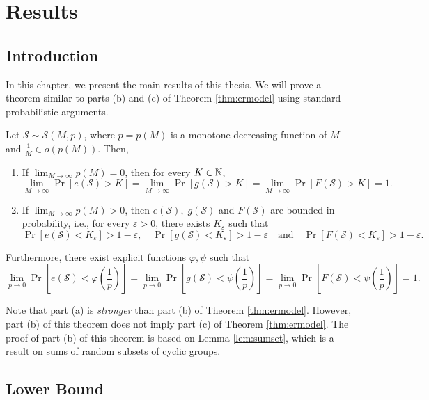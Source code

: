 \chapter{Results}\label{chap:results}


\section{Introduction}  

In this chapter, we present the main results of this thesis. We will prove a theorem similar to parts (b) and (c) of Theorem \ref{thm:ermodel} using standard probabilistic arguments. 

\begin{theorem}\label{thm:main}
    Let $\mathcal{S} \sim \mathcal{S}(M, p)$, where $p = p(M)$ is a monotone decreasing function of $M$ and $\frac{1}{M} \in o(p(M))$. Then, 
\begin{enumerate}[label=(\alph*)]
    \item If $\lim_{M \to \infty} p(M) = 0$, then for every $K \in \mathbb{N}$,   
    \[\lim_{M \to \infty} \Pr[e(\mathcal{S}) > K] = \lim_{M \to \infty} \Pr[g(\mathcal{S}) > K] = \lim_{M \to \infty} \Pr[F(\mathcal{S}) > K] = 1.\]
    \item If $\lim_{M \to \infty} p(M) > 0$, then $e(\mathcal{S}), \; g(\mathcal{S})$ and $F(\mathcal{S})$ are bounded in probability, i.e., for every $\varepsilon > 0$, there exists $K_\varepsilon$ such that 
    \[ \Pr[e(\mathcal{S}) < K_\varepsilon] > 1 - \varepsilon, \quad  \Pr[g(\mathcal{S}) < K_\varepsilon] > 1- \varepsilon \quad \text{and} \quad \Pr[F(\mathcal{S}) < K_\varepsilon] > 1 - \varepsilon.\]
\end{enumerate}
Furthermore, there exist explicit functions $\varphi, \psi$ such that 
\[\lim_{p \to 0} \Pr\left[e(\mathcal{S}) < \varphi\left(\frac{1}{p}\right)\right] = \lim_{p \to 0} \Pr\left[g(\mathcal{S}) < \psi\left(\frac{1}{p}\right)\right]  = \lim_{p \to 0} \Pr\left[F(\mathcal{S}) < \psi\left(\frac{1}{p}\right)\right] = 1.\]
\end{theorem}
Note that part (a) is \textit{stronger} than part (b) of Theorem \ref{thm:ermodel}. However, part (b) of this theorem does not imply part (c) of Theorem \ref{thm:ermodel}. The proof of part (b) of this theorem is based on Lemma \ref{lem:sumset}, which is a result on sums of random subsets of cyclic groups.  

\section{Lower Bound}\label{sec:results:lowerbound}

